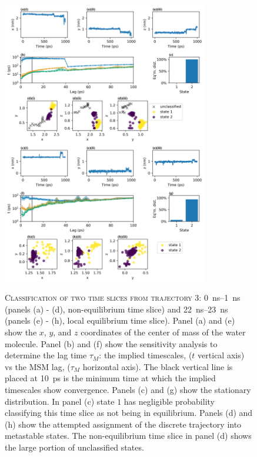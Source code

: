\begin{figure}[p]
    \centering
    \caption[Classification of two time slices from trajectory 3]{\textsc{Classification of two time slices from trajectory 3}: \SIrange{0}{1}{\nano\second} (panels (a) - (d), non-equilibrium time slice) and \SIrange{22}{23}{\nano\second} (panels (e) - (h), local equilibrium time slice). Panel (a) and (e) show the $x$, $y$, and $z$ coordinates of the center of mass of the water molecule. Panel (b) and (f) show the sensitivity analysis to determine the lag time $\tau_{M}$: the implied timescales, ($t$ vertical axis) vs the MSM lag, ($\tau_{M}$ horizontal axis). The black vertical line is placed at \SI{10}{\pico\second} is the minimum time at which the implied timescales show convergence. Panels (c) and (g) show the stationary distribution. In panel (c) state $1$ has negligible probability classifying this time slice as not being in equilibrium. Panels (d) and (h) show the attempted assignment of the discrete trajectory into metastable states. The non-equilibrium time slice in panel (d) shows the large portion of unclassified states.}
    \includegraphics[width=0.8\textwidth]{chapters/water_hopping/figures/Fig_S11.png}
    \label{fig:wat_s10}
\end{figure}

